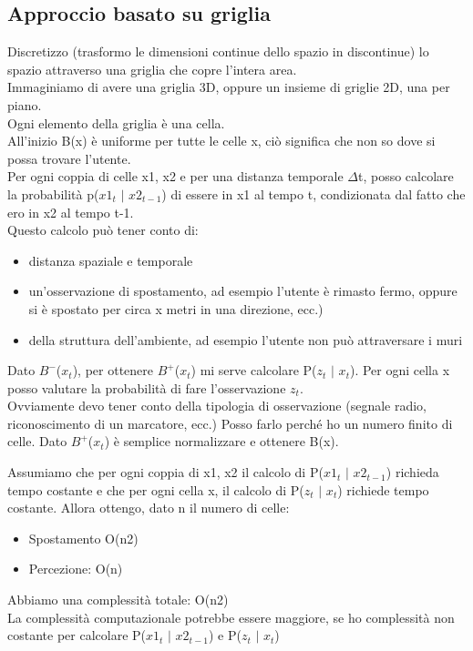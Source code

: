 \subsection{Approccio basato su griglia}
Discretizzo (trasformo le dimensioni continue dello spazio in discontinue) lo spazio attraverso una griglia che copre l'intera area. \\ Immaginiamo di avere una griglia 3D, oppure un insieme di griglie 2D, una per piano. 
\\ Ogni elemento della griglia è una cella. 
\\ All'inizio B(x) è uniforme per tutte le celle x, ciò significa che non so dove si possa trovare l'utente. 
\\ Per ogni coppia di celle x1, x2 e per una distanza temporale $\Delta$t, posso calcolare la probabilità p($x1_t$ $|$ $x2_{t-1}$) di essere in x1 al tempo t, condizionata dal fatto che ero in x2 al tempo t-1. 
\\ Questo calcolo può tener conto di:
\begin{itemize}
    \item distanza spaziale e temporale
    \item un'osservazione di spostamento, ad esempio l'utente è rimasto fermo, oppure si è spostato per circa x metri in una direzione, ecc.)
    \item della struttura dell'ambiente, ad esempio l'utente non può attraversare i muri
\end{itemize}

Dato $B^-$($x_t$), per ottenere $B^+$($x_t$) mi serve calcolare P($z_t$ $|$ $x_t$).
Per ogni cella x posso valutare la probabilità di fare l’osservazione $z_t$.
\\ Ovviamente devo tener conto della tipologia di osservazione (segnale radio, riconoscimento di un marcatore, ecc.)
Posso farlo perché ho un numero finito di celle.
Dato $B^+$($x_t$) è semplice normalizzare e ottenere B(x).

Assumiamo che per ogni coppia di x1, x2 il calcolo di P($x1_t$ $|$ $x2_{t-1}$) richieda tempo costante e che per ogni cella x, il calcolo di  P($z_t$ $|$ $x_t$) richiede tempo costante.
Allora ottengo, dato n il numero di celle:
\begin{itemize}
    \item Spostamento O(n2)
    \item Percezione: O(n)
\end{itemize}
Abbiamo una complessità totale: O(n2)
\\ La complessità computazionale potrebbe essere maggiore, se ho complessità non costante per calcolare  P($x1_t$ $|$ $x2_{t-1}$) e P($z_t$ $|$ $x_t$) 

